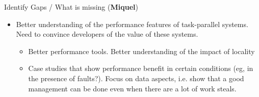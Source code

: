Identify Gaps / What is missing  (\textbf{Miquel})
	    \begin{itemize}
		\item Better understanding of the performance features of task-parallel
		systems. Need to convince developers of the value of these systems.
		\begin{itemize}
		  \item Better performance tools. Better understanding of the impact of locality
		  \item Case studies that show performance benefit in certain conditions (eg,
		    in the presence of faults?). Focus on data aspects, i.e. show that
		    a good management can be done even when there are a lot of work steals.
	      \end{itemize}
	  \end{itemize}

































































